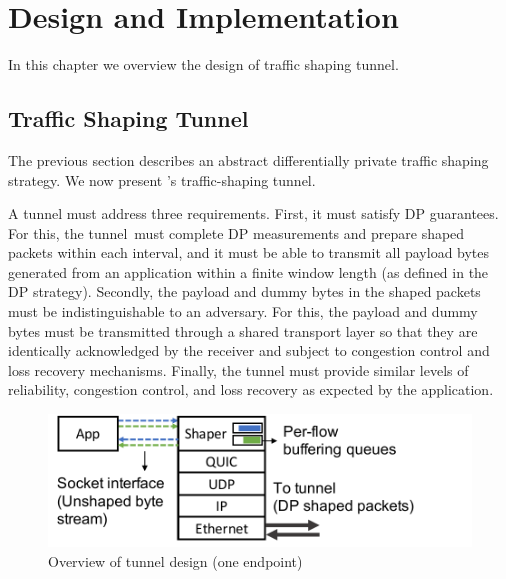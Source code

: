 \chapter{Design and Implementation}\label{ch:design-implementation}
In this chapter we overview the design of {\sys} traffic shaping tunnel. 

\section{Traffic Shaping Tunnel}

The previous section describes an abstract differentially private traffic shaping strategy.
We now present \sys's traffic-shaping tunnel.

A tunnel must address three requirements. First, it must satisfy DP guarantees. For this, the tunnel~must complete DP measurements and prepare shaped packets within each interval, and it must be able to transmit all payload bytes generated from an application within a finite window length (as defined in the DP strategy).
%
Secondly, the payload and dummy bytes in the shaped packets must be indistinguishable to an adversary.
For this, the payload and dummy bytes must be transmitted through a shared transport layer so that they are identically acknowledged by the receiver and subject to congestion control and loss recovery mechanisms.
%
Finally, the tunnel must provide similar levels of reliability, congestion control, and loss recovery as expected by the application.
\begin{figure}[t]
  \centering
  \includegraphics[width=\columnwidth]{figures/design2.pdf}
  \caption{Overview of tunnel design (one endpoint)
  }
  \label{fig:minesvpn-overview}
\end{figure}

